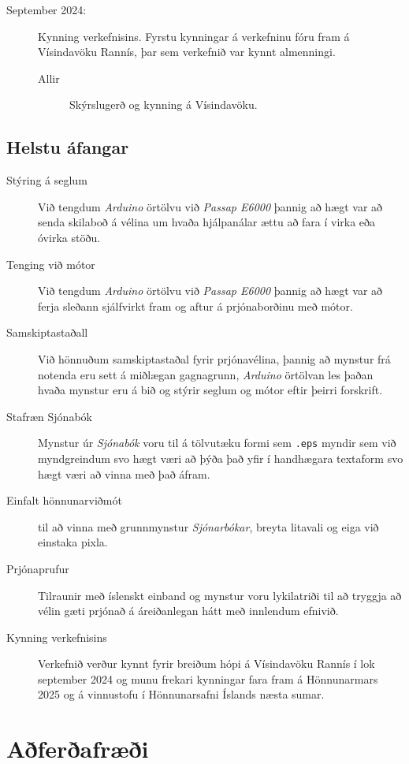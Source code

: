 \documentclass[a4paper,12pt,twoside]{article}
\begin{document}
\begin{description}
\begin{description}
    \end{description}
    \item[September 2024:] Kynning verkefnisins. Fyrstu kynningar á verkefninu fóru fram á Vísindavöku Rannís, þar sem verkefnið var kynnt almenningi. 
    \begin{description}
        \item[Allir] Skýrslugerð og kynning á Vísindavöku.
    \end{description}
\end{description}

\subsection{Helstu áfangar}
\begin{description}
    \item [Stýring á seglum] Við tengdum \textit{Arduino} örtölvu við \textit{Passap E6000} þannig að hægt var að senda skilaboð á vélina um hvaða hjálpanálar ættu að fara í virka eða óvirka stöðu. 
    \item [Tenging við mótor] Við tengdum \textit{Arduino} örtölvu við \textit{Passap E6000} þannig að hægt var að ferja sleðann sjálfvirkt fram og aftur á prjónaborðinu með mótor. 
    \item [Samskiptastaðall] Við hönnuðum samskiptastaðal fyrir prjónavélina, þannig að mynstur frá notenda eru sett á miðlægan gagnagrunn, \textit{Arduino} örtölvan les þaðan hvaða mynstur eru á bið og stýrir seglum og mótor eftir þeirri forskrift. 
    \item [Stafræn Sjónabók] Mynstur úr \textit{Sjónabók} voru til á tölvutæku formi sem \texttt{.eps} myndir sem við myndgreindum svo hægt væri að þýða það yfir í handhægara textaform svo hægt væri að vinna með það áfram. 
    \item [Einfalt hönnunarviðmót] til að vinna með grunnmynstur \textit{Sjónarbókar}, breyta litavali og eiga við einstaka pixla.
    \item [Prjónaprufur] Tilraunir með íslenskt einband og mynstur voru lykilatriði til að tryggja að vélin gæti prjónað á áreiðanlegan hátt með innlendum efnivið.
    \item [Kynning verkefnisins] Verkefnið verður kynnt fyrir breiðum hópi á Vísindavöku Rannís í lok september 2024 og munu frekari kynningar fara fram á Hönnunarmars 2025 og á vinnustofu í Hönnunarsafni Íslands næsta sumar.
\end{description}

\section{Aðferðafræði}\label{sec:adferdafraedi}
\end{document}
